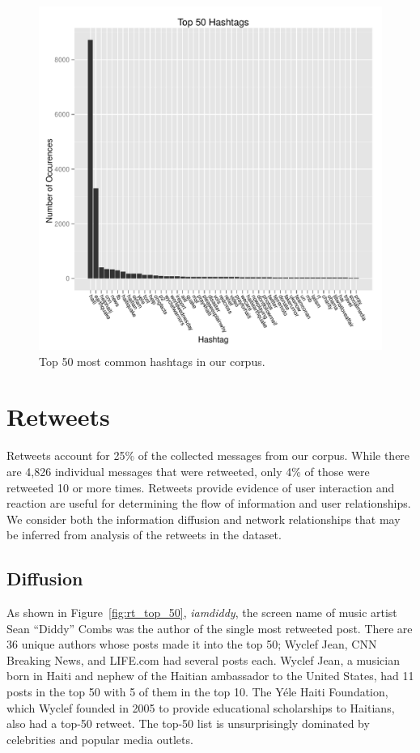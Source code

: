\documentclass[a4paper, 11pt, titlepage]{article}
\begin{document}
\begin{figure}[h]
\centering
\includegraphics[width=\textwidth]{../figures/hashtag_counts.pdf}
\caption{Top 50 most common hashtags in our corpus.}
\label{fig:hashtag_counts}
\end{figure}

\section{Retweets}

Retweets account for 25\% of the collected messages from our corpus.  While there are 4,826 individual messages that were retweeted, only 4\% of those were retweeted 10 or more times.  Retweets provide evidence of user interaction and reaction are useful for determining the flow of information and user relationships.  We consider both the information diffusion and network relationships that may be inferred from analysis of the retweets in the dataset.

\subsection{Diffusion}

As shown in Figure~\ref{fig:rt_top_50}, \textit{iamdiddy}, the screen name of music artist Sean ``Diddy'' Combs was the author of the single most retweeted post.  There are 36 unique authors whose posts made it into the top 50; Wyclef Jean, CNN Breaking News, and LIFE.com had several posts each.  Wyclef Jean, a musician born in Haiti and nephew of the Haitian ambassador to the United States, had 11 posts in the top 50 with 5 of them in the top 10.  The Y\'{e}le Haiti Foundation, which Wyclef founded in 2005 to provide educational scholarships to Haitians, also had a top-50 retweet.  The top-50 list is unsurprisingly dominated by celebrities and popular media outlets.
\end{document}
